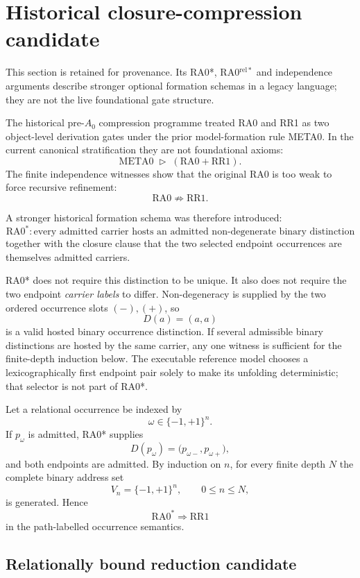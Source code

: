 \documentclass[11pt]{article}
\begin{document}
\section{Historical closure-compression candidate}

This section is retained for provenance. Its RA0*, RA0\(^{\mathrm{rel}*}\)
and independence arguments describe stronger optional formation schemas in a
legacy language; they are not the live foundational gate structure.

The historical pre-\(A_0\) compression programme treated RA0 and RR1 as
two object-level derivation gates under the prior model-formation rule META0.
In the current canonical stratification they are not foundational axioms:
\[
\boxed{
\mathrm{META0}
\;\triangleright\;
(\mathrm{RA0}+\mathrm{RR1}).
}
\]
The finite independence witnesses show that the original RA0 is too weak to
force recursive refinement:
\[
\boxed{\mathrm{RA0}\not\Rightarrow\mathrm{RR1}.}
\]

A stronger historical formation schema was therefore introduced:
\[
\boxed{
\mathrm{RA0}^{*}:
\text{every admitted carrier hosts an admitted non-degenerate binary distinction}
}
\]
together with the closure clause that the two selected endpoint occurrences
are themselves admitted carriers.

RA0* does not require this distinction to be unique. It also does not require
the two endpoint \emph{carrier labels} to differ. Non-degeneracy is supplied
by the two ordered occurrence slots \((-),(+)\), so
\[
D(a)=(a,a)
\]
is a valid hosted binary occurrence distinction. If several admissible
binary distinctions are hosted by the same carrier, any one witness is
sufficient for the finite-depth induction below. The executable reference
model chooses a lexicographically first endpoint pair solely to make its
unfolding deterministic; that selector is not part of RA0*.

Let a relational occurrence be indexed by
\[
\omega\in\{-1,+1\}^{n}.
\]
If \(p_{\omega}\) is admitted, RA0* supplies
\[
D(p_{\omega})
=
\bigl(
p_{\omega-},
p_{\omega+}
\bigr),
\]
and both endpoints are admitted. By induction on \(n\), for every finite
depth \(N\) the complete binary address set
\[
\boxed{
V_n=\{-1,+1\}^{n},
\qquad
0\le n\le N,
}
\]
is generated. Hence
\[
\boxed{
\mathrm{RA0}^{*}\Rightarrow\mathrm{RR1}
}
\]
in the path-labelled occurrence semantics.

\subsection{Relationally bound reduction candidate}
\end{document}
